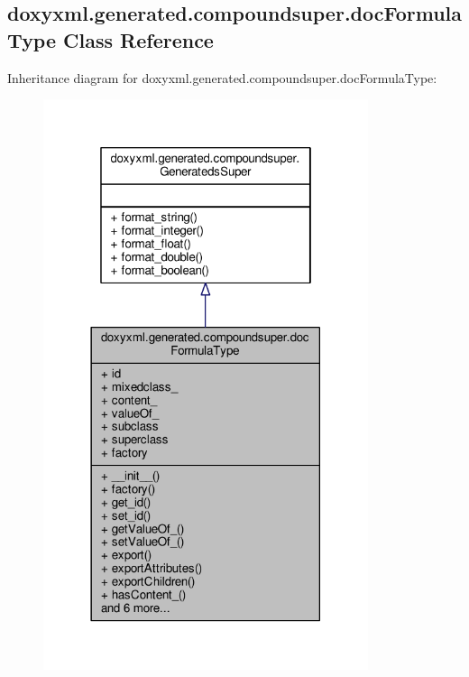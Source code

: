 \subsection{doxyxml.\+generated.\+compoundsuper.\+doc\+Formula\+Type Class Reference}
\label{classdoxyxml_1_1generated_1_1compoundsuper_1_1docFormulaType}


Inheritance diagram for doxyxml.\+generated.\+compoundsuper.\+doc\+Formula\+Type\+:
\nopagebreak
\begin{figure}[H]
\begin{center}
\leavevmode
\includegraphics[width=270pt]{de/dc6/classdoxyxml_1_1generated_1_1compoundsuper_1_1docFormulaType__inherit__graph}
\end{center}
\end{figure}


